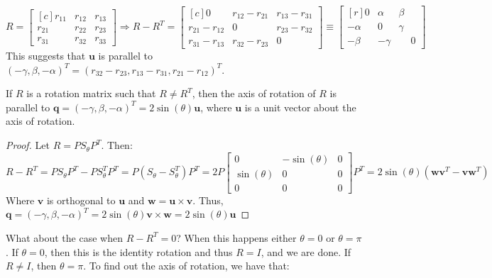     \begin{equation*}
        R = \begin{bmatrix*}[c] r_{11} & r_{12} & r_{13} \\ r_{21} & r_{22} & r_{23} \\ r_{31} & r_{32} & r_{33} \end{bmatrix*} \Rightarrow R-R^{T} = \begin{bmatrix*}[c] 0 & r_{12} - r_{21} & r_{13} - r_{31} \\ r_{21} - r_{12} & 0 & r_{23}-r_{32} \\ r_{31} - r_{13} & r_{32} - r_{23} & 0 \end{bmatrix*}\equiv \begin{bmatrix*}[r] 0 & \alpha & \beta \\ -\alpha & 0 & \gamma \\ -\beta & -\gamma & \phantom{-}0 \end{bmatrix*}
    \end{equation*}
    This suggests that $\mathbf{u}$ is parallel to $(-\gamma, \beta, -\alpha)^{T} = (r_{32}-r_{23}, r_{13}-r_{31}, r_{21}-r_{12})^{T}$.
    \begin{theorem}
    If $R$ is a rotation matrix such that $R\ne R^T$, then the axis of rotation of $R$ is parallel to $\mathbf{q}=(-\gamma, \beta, -\alpha)^{T} = 2\sin(\theta)\mathbf{u}$, where $\mathbf{u}$ is a unit vector about the axis of rotation.
    \end{theorem}
    \begin{proof}
    Let $R = PS_{\theta}P^T$. Then:
    \begin{equation*}
        R-R^{T}=PS_{\theta}P^{T}-PS_{\theta}^{T}P^{T}=P(S_{\theta}-S_{\theta}^{T})P^{T}=2P\begin{bmatrix}0 & -\sin(\theta) & 0 \\ \sin(\theta) & 0 & 0 \\ 0 & 0 & 0 \end{bmatrix}P^{T}= 2\sin(\theta)(\mathbf{w}\mathbf{v}^{T} - \mathbf{v}\mathbf{w}^{T})
    \end{equation*} 
    Where $\mathbf{v}$ is orthogonal to $\mathbf{u}$ and $\mathbf{w} = \mathbf{u}\times \mathbf{v}$. Thus, $\mathbf{q}=(-\gamma,\beta,-\alpha)^{T}=2\sin(\theta)\mathbf{v}\times\mathbf{w}=2\sin(\theta)\mathbf{u}$
    \end{proof}
    What about the case when $R-R^T = 0$? When this happens either $\theta = 0$ or $\theta = \pi$. If $\theta = 0$, then this is the identity rotation and thus $R = I$, and we are done. If $R\ne I$, then $\theta = \pi$. To find out the axis of rotation, we have that:
